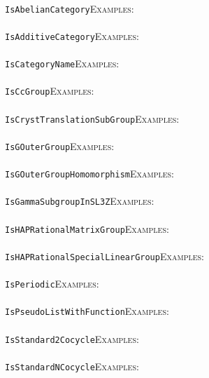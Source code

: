 \documentclass[a4paper,11pt]{report}
\begin{document}
{{ \\
 \texttt{IsAbelianCategory}{\nobreakspace}{\nobreakspace}{\nobreakspace}{\nobreakspace}\textsc{Examples:} \\
 \\
 \texttt{IsAdditiveCategory}{\nobreakspace}{\nobreakspace}{\nobreakspace}{\nobreakspace}\textsc{Examples:} \\
 \\
 \texttt{IsCategoryName}{\nobreakspace}{\nobreakspace}{\nobreakspace}{\nobreakspace}\textsc{Examples:} \\
 \\
 \texttt{IsCcGroup}{\nobreakspace}{\nobreakspace}{\nobreakspace}{\nobreakspace}\textsc{Examples:} \\
 \\
 \texttt{IsCrystTranslationSubGroup}{\nobreakspace}{\nobreakspace}{\nobreakspace}{\nobreakspace}\textsc{Examples:} \\
 \\
 \texttt{IsGOuterGroup}{\nobreakspace}{\nobreakspace}{\nobreakspace}{\nobreakspace}\textsc{Examples:} \\
 \\
 \texttt{IsGOuterGroupHomomorphism}{\nobreakspace}{\nobreakspace}{\nobreakspace}{\nobreakspace}\textsc{Examples:} \\
 \\
 \texttt{IsGammaSubgroupInSL3Z}{\nobreakspace}{\nobreakspace}{\nobreakspace}{\nobreakspace}\textsc{Examples:} \\
 \\
 \texttt{IsHAPRationalMatrixGroup}{\nobreakspace}{\nobreakspace}{\nobreakspace}{\nobreakspace}\textsc{Examples:} \\
 \\
 \texttt{IsHAPRationalSpecialLinearGroup}{\nobreakspace}{\nobreakspace}{\nobreakspace}{\nobreakspace}\textsc{Examples:} \\
 \\
 \texttt{IsPeriodic}{\nobreakspace}{\nobreakspace}{\nobreakspace}{\nobreakspace}\textsc{Examples:} \\
 \\
 \texttt{IsPseudoListWithFunction}{\nobreakspace}{\nobreakspace}{\nobreakspace}{\nobreakspace}\textsc{Examples:} \\
 \\
 \texttt{IsStandard2Cocycle}{\nobreakspace}{\nobreakspace}{\nobreakspace}{\nobreakspace}\textsc{Examples:} \\
 \\
 \texttt{IsStandardNCocycle}{\nobreakspace}{\nobreakspace}{\nobreakspace}{\nobreakspace}\textsc{Examples:} \\
}}
\end{document}
